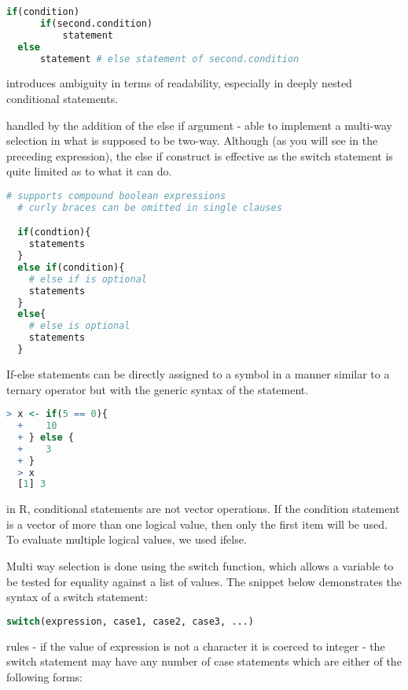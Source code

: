 \documentclass[12pt]{article}
\begin{document}
\begin{lstlisting}[language=R]
  if(condition)
      if(second.condition)
          statement
  else
      statement # else statement of second.condition
\end{lstlisting}

introduces ambiguity in terms of readability, especially in deeply nested conditional statements.

handled by the addition of the else if argument - able to implement a multi-way selection in what is supposed to be two-way. Although (as you will see in the preceding expression), the else if construct is effective as the switch statement is quite limited as to what it can do.

\begin{lstlisting}[language=R]
  # supports compound boolean expressions
  # curly braces can be omitted in single clauses

  if(condtion){
    statements
  }
  else if(condition){
    # else if is optional
    statements
  }
  else{
    # else is optional
    statements
  }

\end{lstlisting}

If-else statements can be directly assigned to a symbol in a manner similar to a ternary operator but with the generic syntax of the statement.

\begin{lstlisting}[language=R]
  > x <- if(5 == 0){
  +    10
  + } else {
  +    3
  + }
  > x
  [1] 3
\end{lstlisting}

in R, conditional statements are not vector operations. If the condition statement is a vector of more than one logical value, then only the first item will be used. To evaluate multiple logical values, we used ifelse.

Multi way selection is done using the switch function, which allows a variable to be tested for equality against a list of values. The snippet below demonstrates the syntax of a switch statement:

\begin{lstlisting}[language=R]
  switch(expression, case1, case2, case3, ...)
\end{lstlisting}

rules
- if the value of expression is not a character it is coerced to integer
- the switch statement may have any number of case statements which are either of the following forms:
\end{document}
